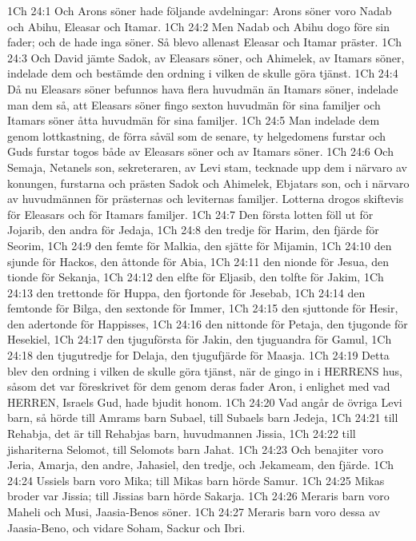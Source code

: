 1Ch 24:1  Och Arons söner hade följande avdelningar: Arons söner voro Nadab och Abihu, Eleasar och Itamar.
1Ch 24:2  Men Nadab och Abihu dogo före sin fader; och de hade inga söner. Så blevo allenast Eleasar och Itamar präster.
1Ch 24:3  Och David jämte Sadok, av Eleasars söner, och Ahimelek, av Itamars söner, indelade dem och bestämde den ordning i vilken de skulle göra tjänst.
1Ch 24:4  Då nu Eleasars söner befunnos hava flera huvudmän än Itamars söner, indelade man dem så, att Eleasars söner fingo sexton huvudmän för sina familjer och Itamars söner åtta huvudmän för sina familjer.
1Ch 24:5  Man indelade dem genom lottkastning, de förra såväl som de senare, ty helgedomens furstar och Guds furstar togos både av Eleasars söner och av Itamars söner.
1Ch 24:6  Och Semaja, Netanels son, sekreteraren, av Levi stam, tecknade upp dem i närvaro av konungen, furstarna och prästen Sadok och Ahimelek, Ebjatars son, och i närvaro av huvudmännen för prästernas och leviternas familjer. Lotterna drogos skiftevis för Eleasars och för Itamars familjer.
1Ch 24:7  Den första lotten föll ut för Jojarib, den andra för Jedaja,
1Ch 24:8  den tredje för Harim, den fjärde för Seorim,
1Ch 24:9  den femte för Malkia, den sjätte för Mijamin,
1Ch 24:10  den sjunde för Hackos, den åttonde för Abia,
1Ch 24:11  den nionde för Jesua, den tionde för Sekanja,
1Ch 24:12  den elfte för Eljasib, den tolfte för Jakim,
1Ch 24:13  den trettonde för Huppa, den fjortonde för Jesebab,
1Ch 24:14  den femtonde för Bilga, den sextonde för Immer,
1Ch 24:15  den sjuttonde för Hesir, den adertonde för Happisses,
1Ch 24:16  den nittonde för Petaja, den tjugonde för Hesekiel,
1Ch 24:17  den tjuguförsta för Jakin, den tjuguandra för Gamul,
1Ch 24:18  den tjugutredje for Delaja, den tjugufjärde för Maasja.
1Ch 24:19  Detta blev den ordning i vilken de skulle göra tjänst, när de gingo in i HERRENS hus, såsom det var föreskrivet för dem genom deras fader Aron, i enlighet med vad HERREN, Israels Gud, hade bjudit honom.
1Ch 24:20  Vad angår de övriga Levi barn, så hörde till Amrams barn Subael, till Subaels barn Jedeja,
1Ch 24:21  till Rehabja, det är till Rehabjas barn, huvudmannen Jissia,
1Ch 24:22  till jishariterna Selomot, till Selomots barn Jahat.
1Ch 24:23  Och benajiter voro Jeria, Amarja, den andre, Jahasiel, den tredje, och Jekameam, den fjärde.
1Ch 24:24  Ussiels barn voro Mika; till Mikas barn hörde Samur.
1Ch 24:25  Mikas broder var Jissia; till Jissias barn hörde Sakarja.
1Ch 24:26  Meraris barn voro Maheli och Musi, Jaasia-Benos söner.
1Ch 24:27  Meraris barn voro dessa av Jaasia-Beno, och vidare Soham, Sackur och Ibri.
